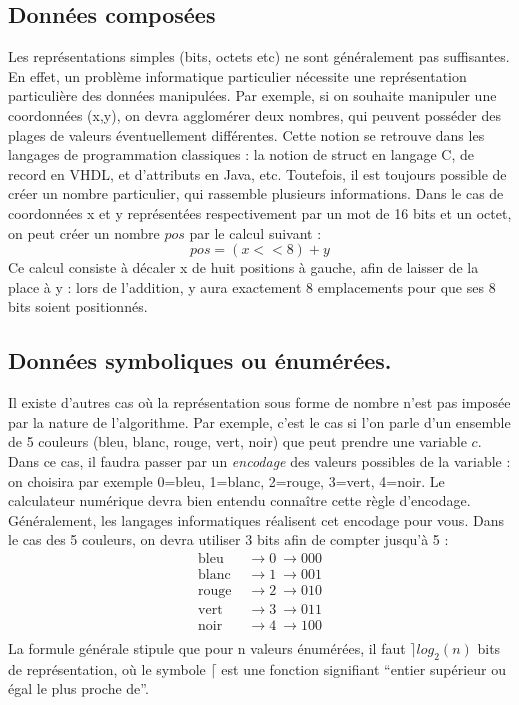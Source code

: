 \subsection{Données composées}
Les représentations simples (bits, octets etc) ne sont généralement pas suffisantes. En effet, un problème informatique particulier nécessite une représentation particulière des données manipulées. Par exemple, si on souhaite manipuler une coordonnées (x,y), on devra agglomérer deux nombres, qui peuvent posséder des plages de valeurs éventuellement différentes. Cette notion se retrouve dans les langages de programmation classiques : la notion de struct en langage C, de record en VHDL, et d'attributs en Java, etc. Toutefois, il est toujours possible de créer un nombre particulier, qui rassemble plusieurs informations. Dans le cas de coordonnées x et y représentées respectivement par un mot de 16 bits et un octet, on peut créer un nombre $pos$ par le calcul suivant :
$$ pos = (x << 8) + y $$
Ce calcul consiste à décaler x de huit positions à gauche, afin de laisser de la place à y : lors de l'addition, y aura exactement 8 emplacements pour que ses 8 bits soient positionnés.

\subsection{Données symboliques ou énumérées.}
Il existe d'autres cas où la représentation sous forme de nombre n'est pas imposée par la nature de l'algorithme. Par exemple, c'est le cas si l'on parle d'un ensemble de 5 couleurs (bleu, blanc, rouge, vert, noir) que peut prendre une variable $c$. Dans ce cas, il faudra passer par un {\it encodage} des valeurs possibles de la variable : on choisira par exemple 0=bleu, 1=blanc, 2=rouge, 3=vert, 4=noir. Le calculateur numérique devra bien entendu connaître cette règle d'encodage. Généralement, les langages informatiques réalisent cet encodage pour vous. Dans le cas des 5 couleurs, on devra utiliser 3 bits afin de compter jusqu'à 5 :
\begin{align*}
\mbox{bleu  } &\rightarrow 0\ \rightarrow 000\\
\mbox{blanc } &\rightarrow 1\ \rightarrow 001\\
\mbox{rouge } &\rightarrow 2\ \rightarrow 010\\
\mbox{vert  } &\rightarrow 3\ \rightarrow 011\\
\mbox{noir  } &\rightarrow 4\ \rightarrow 100\\
\end{align*}
La formule générale stipule que pour n valeurs énumérées, il faut $\rceil log_2(n)$ bits de représentation, où le symbole $\lceil$ est une fonction signifiant ``entier supérieur ou égal le plus proche de''.

